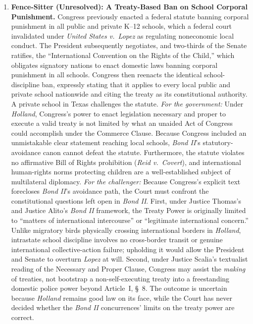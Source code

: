 \documentclass[12pt]{article}
\begin{document}
\begin{enumerate}
\item \textbf{Fence-Sitter (Unresolved): A Treaty-Based Ban on School Corporal Punishment.} Congress previously enacted a federal statute banning corporal punishment in all public and private K--12 schools, which a federal court invalidated under \textit{United States v.\ Lopez} as regulating noneconomic local conduct. The President subsequently negotiates, and two-thirds of the Senate ratifies, the ``International Convention on the Rights of the Child,'' which obligates signatory nations to enact domestic laws banning corporal punishment in all schools. Congress then reenacts the identical school-discipline ban, expressly stating that it applies to every local public and private school nationwide and citing the treaty as its constitutional authority. A private school in Texas challenges the statute. \textit{For the government:} Under \textit{Holland}, Congress's power to enact legislation necessary and proper to execute a valid treaty is not limited by what an unaided Act of Congress could accomplish under the Commerce Clause. Because Congress included an unmistakable clear statement reaching local schools, \textit{Bond II}'s statutory-avoidance canon cannot defeat the statute. Furthermore, the statute violates no affirmative Bill of Rights prohibition (\textit{Reid v.\ Covert}), and international human-rights norms protecting children are a well-established subject of multilateral diplomacy. \textit{For the challenger:} Because Congress's explicit text forecloses \textit{Bond II}'s avoidance path, the Court must confront the constitutional questions left open in \textit{Bond II}. First, under Justice Thomas's and Justice Alito's \textit{Bond II} framework, the Treaty Power is originally limited to ``matters of international intercourse'' or ``legitimate international concern.'' Unlike migratory birds physically crossing international borders in \textit{Holland}, intrastate school discipline involves no cross-border transit or genuine international collective-action failure; upholding it would allow the President and Senate to overturn \textit{Lopez} at will. Second, under Justice Scalia's textualist reading of the Necessary and Proper Clause, Congress may assist the \textit{making} of treaties, not bootstrap a non-self-executing treaty into a freestanding domestic police power beyond Article~I, \S~8. The outcome is uncertain because \textit{Holland} remains good law on its face, while the Court has never decided whether the \textit{Bond II} concurrences' limits on the treaty power are correct.

\end{enumerate}
\end{document}
